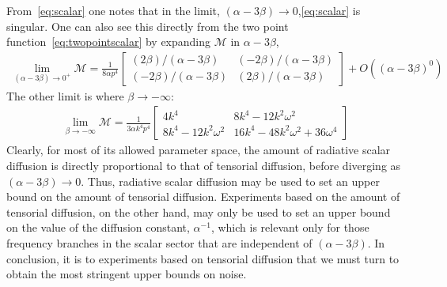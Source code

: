 \documentclass[aps,preprintnumbers,superscriptaddress,longbibliography]{revtex4-1}
\begin{document}
 From~\eqref{eq:scalar} one notes that in the limit, $(\alpha-3\beta)\rightarrow0$,\eqref{eq:scalar} is singular. One can also see this directly from the two point function~\eqref{eq:twopointscalar} by expanding $\mathcal{M}$ in   $\alpha-3\beta$,
\begin{align}
    \lim_{(\alpha-3\beta)\rightarrow0^+}\mathcal{M}=\frac{1}{8\alpha p^4}\begin{bmatrix}
    (2\beta)/(\alpha-3\beta) & (-2\beta)/(\alpha-3\beta)\\  (-2\beta)/(\alpha-3\beta)&(2\beta)/(\alpha-3\beta)
\end{bmatrix}+O((\alpha-3\beta)^0)
\end{align}
The other limit is where $\beta \rightarrow-\infty$:
\begin{align}
    \lim_{\beta\rightarrow-\infty}\mathcal{M}=\frac{1}{3\alpha k^4p^4}\begin{bmatrix}
    4k^4 & 8k^4-12k^2\omega^2\\   8k^4-12k^2\omega^2&16k^4-48k^2\omega^2+36\omega^4
\end{bmatrix}
\end{align}
Clearly, for most of its allowed parameter space, the amount of radiative scalar diffusion is directly proportional to that of tensorial diffusion, before diverging as $(\alpha-3\beta)\rightarrow0$. Thus, radiative scalar diffusion may be used to set an upper bound on the amount of tensorial diffusion. Experiments based on the amount of tensorial diffusion, on the other hand, may only be used to set an upper bound on the value of the diffusion constant, $\alpha^{-1}$, which is relevant only for those frequency branches in the scalar sector that are independent of $(\alpha-3\beta)$. In conclusion, it is to experiments based on tensorial diffusion that we must turn to obtain the most stringent upper bounds on noise. 
\end{document}
